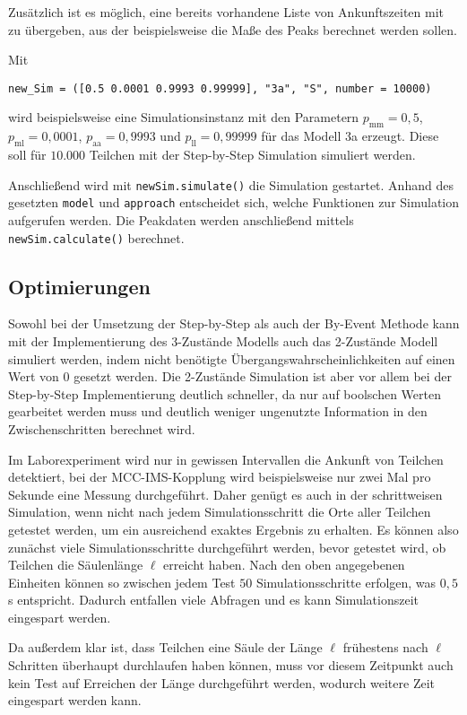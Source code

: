 Zusätzlich ist es möglich, eine bereits vorhandene Liste von Ankunftszeiten mit zu übergeben, aus der beispielsweise die Maße des Peaks berechnet werden sollen.

Mit \begin{verbatim}
new_Sim = ([0.5 0.0001 0.9993 0.99999], "3a", "S", number = 10000)
\end{verbatim} 
wird beispielsweise eine Simulationsinstanz mit den Parametern $p_{\text{mm}} = 0,5$, $p_{\text{ml}} = 0,0001$, $p_{\text{aa}} = 0,9993$ und $p_{\text{ll}} = 0,99999$ für das Modell 3a erzeugt. Diese soll für $10.000$ Teilchen mit der Step-by-Step Simulation simuliert werden.

Anschließend wird mit \verb!newSim.simulate()! die Simulation gestartet. Anhand des gesetzten \verb!model! und \verb!approach! entscheidet sich, welche Funktionen zur Simulation aufgerufen werden. Die Peakdaten werden anschließend mittels \verb!newSim.calculate()! berechnet.


\subsection{Optimierungen}
Sowohl bei der Umsetzung der Step-by-Step als auch der By-Event Methode kann mit der Implementierung des 3-Zustände Modells auch das 2-Zustände Modell simuliert werden, indem nicht benötigte Übergangswahrscheinlichkeiten auf einen Wert von $0$ gesetzt werden. Die 2-Zustände Simulation ist aber vor allem bei der Step-by-Step Implementierung deutlich schneller, da nur auf boolschen Werten gearbeitet werden muss und deutlich weniger ungenutzte Information in den Zwischenschritten berechnet wird.

Im Laborexperiment wird nur in gewissen Intervallen die Ankunft von Teilchen detektiert, bei der MCC-IMS-Kopplung wird beispielsweise nur zwei Mal pro Sekunde eine Messung durchgeführt. Daher genügt es auch in der schrittweisen Simulation, wenn nicht nach jedem Simulationsschritt die Orte aller Teilchen getestet werden, um ein ausreichend exaktes Ergebnis zu erhalten.
Es können also zunächst viele Simulationsschritte durchgeführt werden, bevor getestet wird, ob Teilchen die Säulenlänge $\ell$ erreicht haben. Nach den oben angegebenen Einheiten können so zwischen jedem Test $50$ Simulationsschritte erfolgen, was $0,5$ s entspricht. Dadurch entfallen viele Abfragen und es kann Simulationszeit eingespart werden. 

Da außerdem klar ist, dass Teilchen eine Säule der Länge $\ell$ frühestens nach $\ell$ Schritten überhaupt durchlaufen haben können, muss vor diesem Zeitpunkt auch kein Test auf Erreichen der Länge durchgeführt werden, wodurch weitere Zeit eingespart werden kann.

